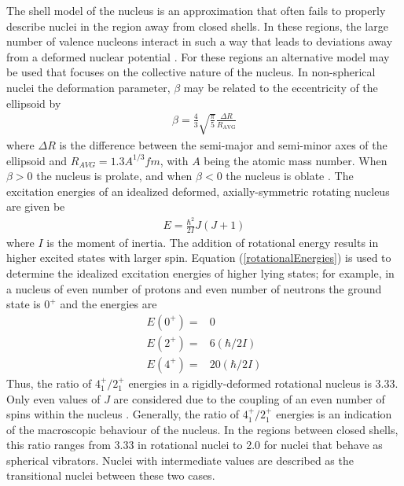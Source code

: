 \documentclass[twocolumn,preprintnumbers,amsmath,amssymb]{revtex4}
\begin{document}
The shell model of the nucleus is an approximation that often fails to properly describe nuclei in the region away from closed shells. In these regions, the large number of valence nucleons interact in such a way that leads to deviations away from a deformed nuclear potential \cite{evitts_74}. For these regions an alternative model may be used that focuses on the collective nature of the nucleus. In non-spherical nuclei the deformation parameter, $\beta$ may be related to the eccentricity of the ellipsoid by
\begin{gather}
\beta = \frac{4}{3}\sqrt{\frac{\pi}{5}}\frac{\Delta R}{R_{\mathrm{AVG}}}
\label{beta}
\end{gather}
where $\Delta R$ is the difference between the semi-major and semi-minor axes of the ellipsoid and $R_{AVG}=1.3A^{1/3} \si{fm}$, with $A$ being the atomic mass number. When $\beta>0$ the nucleus is prolate, and when $\beta<0$ the nucleus is oblate \cite{evitts_4}. The excitation energies of an idealized deformed, axially-symmetric rotating nucleus are given be
\begin{gather}
E = \frac{\hbar^2}{2I}J(J+1)
\label{rotationalEnergies}
\end{gather}
where $I$ is the moment of inertia. The addition of rotational energy results in higher excited states with larger spin. Equation (\ref{rotationalEnergies}) is used to determine the idealized excitation energies of higher lying states; for example, in a nucleus of even number of protons and even number of neutrons the ground state is $0^+$ and the energies are
\begin{equation}
\begin{aligned}
E(0^+) ={} & 0 \\
E(2^+) ={} & 6(\hbar/2I) \\
E(4^+) ={} & 20(\hbar/2I)
\label{Energies}
\end{aligned}
\end{equation}
Thus, the ratio of $4^+_1/2^+_1$ energies in a rigidly-deformed rotational nucleus is 3.33. Only even values of $J$ are considered due to the coupling of an even number of spins within the nucleus \cite{evitts_4}. Generally, the ratio of $4^+_1/2^+_1$ energies is an indication of the macroscopic behaviour of the nucleus. In the regions between closed shells, this ratio ranges from 3.33 in rotational nuclei to 2.0 for nuclei that behave as spherical vibrators. Nuclei with intermediate values are described as the transitional nuclei between these two cases.
\end{document}
